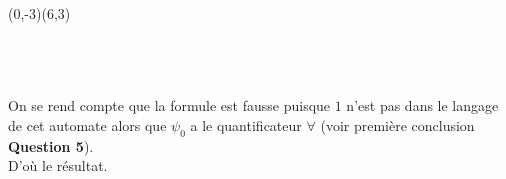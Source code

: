 \documentclass[12pt,letterpaper,boxed]{hmcpset}
\begin{document}
\begin{solution}
\begin{center}
\begin{VCPicture}{(0,-3)(6,3)}


\end{VCPicture}
\end{center}
\ \\ \\ \\


On se rend compte que la formule est fausse puisque $1$ n'est pas dans le langage de cet automate alors que $\psi_{0}$ a le quantificateur $\forall$ (voir première conclusion \textbf{Question 5}). \\
D'où le résultat.
\end{solution}
\end{document}
